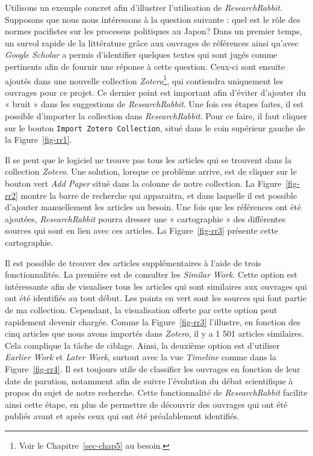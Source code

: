 \documentclass[
  letterpaper,
  DIV=11,
  numbers=noendperiod,
  oneside]{scrreprt}
\begin{document}
Utilisons un exemple concret afin d'illustrer l'utilisation de
\emph{ResearchRabbit}. Supposons que nous nous intéressons à la question
suivante : quel est le rôle des normes pacifistes sur les processus
politiques au Japon? Dans un premier temps, un survol rapide de la
littérature grâce aux ouvrages de références ainsi qu'avec \emph{Google
Scholar} a permis d'identifier quelques textes qui sont jugés comme
pertinents afin de fournir une réponse à cette question. Ceux-ci sont
ensuite ajoutés dans une nouvelle collection \emph{Zotero}\footnote{Voir
  le Chapitre~\ref{sec-chap5} au besoin.}, qui contiendra uniquement les
ouvrages pour ce projet. Ce dernier point est important afin d'éviter
d'ajouter du « bruit » dans les suggestions de \emph{ResearchRabbit}.
Une fois ces étapes faites, il est possible d'importer la collection
dans \emph{ResearchRabbit}. Pour ce faire, il faut cliquer sur le bouton
\texttt{Import\ Zotero\ Collection}, situé dans le coin supérieur gauche
de la Figure~\ref{fig-rr1}.

Il se peut que le logiciel ne trouve pas tous les articles qui se
trouvent dans la collection \emph{Zotero}. Une solution, lorsque ce
problème arrive, est de cliquer sur le bouton vert \emph{Add Paper}
situé dans la colonne de notre collection. La Figure~\ref{fig-rr2}
montre la barre de recherche qui apparaitra, et dans laquelle il est
possible d'ajouter manuellement les articles au besoin. Une fois que les
références ont été ajoutées, \emph{ResearchRabbit} pourra dresser une «
cartographie » des différentes sources qui sont en lien avec ces
articles. La Figure~\ref{fig-rr3} présente cette cartographie.

Il est possible de trouver des articles supplémentaires à l'aide de
trois fonctionnalités. La première est de consulter les \emph{Similar
Work}. Cette option est intéressante afin de visualiser tous les
articles qui sont similaires aux ouvrages qui ont été identifiés au tout
début. Les points en vert sont les sources qui font partie de ma
collection. Cependant, la visualisation offerte par cette option peut
rapidement devenir chargée. Comme la Figure~\ref{fig-rr3} l'illustre, en
fonction des cinq articles que nous avons importés dans \emph{Zotero},
il y a 1 501 articles similaires. Cela complique la tâche de ciblage.
Ainsi, la deuxième option est d'utiliser \emph{Earlier Work} et
\emph{Later Work}, surtout avec la vue \emph{Timeline} comme dans la
Figure~\ref{fig-rr4}. Il est toujours utile de classifier les ouvrages
en fonction de leur date de parution, notamment afin de suivre
l'évolution du débat scientifique à propos du sujet de notre recherche.
Cette fonctionnalité de \emph{ResearchRabbit} facilite ainsi cette
étape, en plus de permettre de découvrir des ouvrages qui ont été
publiés avant et après ceux qui ont été préalablement identifiés.
\end{document}
